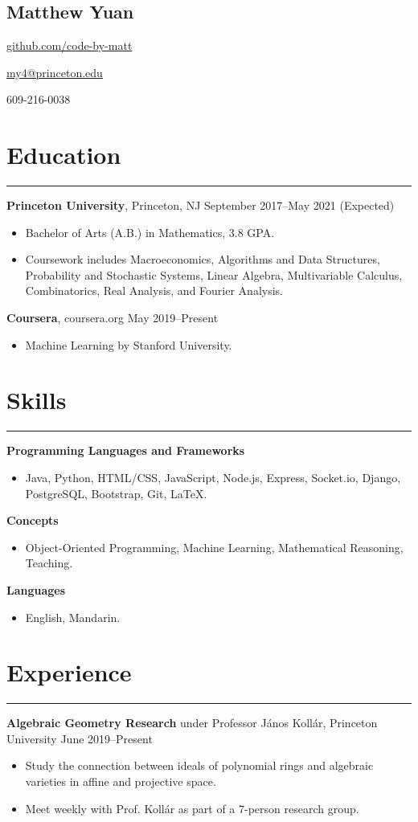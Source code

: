 \documentclass[11pt]{article}
\newcommand{\name}[1]{\begin{center}\section*{\huge #1}\end{center}}
\newcommand{\topinfo}[1]{\begin{center}\vspace{-0.2cm}#1\vspace{-0.2cm}\end{center}}
\newcommand{\resumesection}[1]{\vspace{-0.2cm}\section*{#1}\vspace{-0.2cm}\hrule\vspace{0.2cm}}
\begin{document}
\name{Matthew Yuan}
\topinfo{\href{https://github.com/code-by-matt}{github.com/code-by-matt}}
\topinfo{\href{mailto:my4@princeton.edu}{my4@princeton.edu}}
\topinfo{609-216-0038}

\resumesection{Education}

\textbf{Princeton University}, Princeton, NJ \hfill September 2017--May 2021 (Expected)
\begin{itemize}
	\item Bachelor of Arts (A.B.) in Mathematics, 3.8 GPA.
	\item Coursework includes Macroeconomics, Algorithms and Data Structures, Probability and Stochastic Systems, Linear Algebra, Multivariable Calculus, Combinatorics, Real Analysis, and Fourier Analysis.
\end{itemize}

\textbf{Coursera}, coursera.org \hfill May 2019--Present
\begin{itemize}
	\item Machine Learning by Stanford University.
\end{itemize}

\resumesection{Skills}

\textbf{Programming Languages and Frameworks}
\begin{itemize}
	\item Java, Python, HTML/CSS, JavaScript, Node.js, Express, Socket.io, Django, PostgreSQL, Bootstrap, Git, \LaTeX.
\end{itemize}

\textbf{Concepts}
\begin{itemize}
	\item Object-Oriented Programming, Machine Learning, Mathematical Reasoning, Teaching.
\end{itemize}

\textbf{Languages}
\begin{itemize}
	\item English, Mandarin.
\end{itemize}

\resumesection{Experience}

\textbf{Algebraic Geometry Research} under Professor J\'{a}nos Koll\'{a}r, Princeton University \hfill June 2019--Present
\begin{itemize}
	\item Study the connection between ideals of polynomial rings and algebraic varieties in affine and projective space.
	\item Meet weekly with Prof. Koll\'{a}r as part of a 7-person research group.
\end{itemize}
\end{document}
